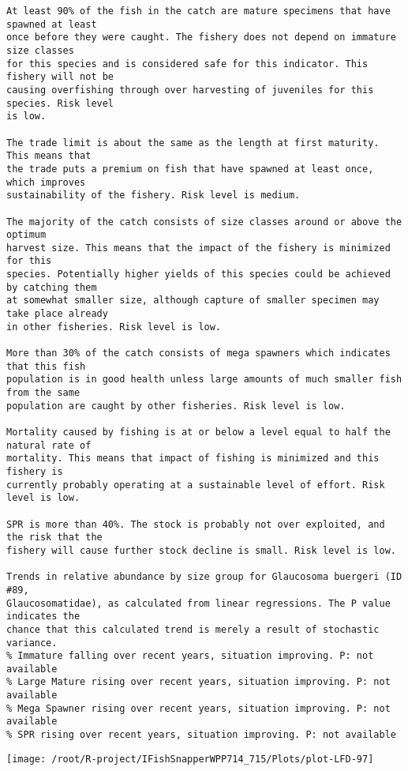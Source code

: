 \documentclass{report}\usepackage[]{graphicx}\usepackage[]{color}
\makeatletter
\def\maxwidth{ %
  \ifdim\Gin@nat@width>\linewidth
    \linewidth
  \else
    \Gin@nat@width
  \fi
}
\newenvironment{kframe}{%
 \def\at@end@of@kframe{}%
 \ifinner\ifhmode%
  \def\at@end@of@kframe{\end{minipage}}%
  \begin{minipage}{\columnwidth}%
 \fi\fi%
 \def\FrameCommand##1{\hskip\@totalleftmargin \hskip-\fboxsep
 \colorbox{shadecolor}{##1}\hskip-\fboxsep
     \hskip-\linewidth \hskip-\@totalleftmargin \hskip\columnwidth}%
 \MakeFramed {\advance\hsize-\width
   \@totalleftmargin\z@ \linewidth\hsize
   \@setminipage}}%
 {\par\unskip\endMakeFramed%
 \at@end@of@kframe}
\newenvironment{knitrout}{}{} %
\makeatother
\begin{document}
\begin{knitrout}
\begin{kframe}
\begin{verbatim}
At least 90% of the fish in the catch are mature specimens that have spawned at least
once before they were caught. The fishery does not depend on immature size classes
for this species and is considered safe for this indicator. This fishery will not be
causing overfishing through over harvesting of juveniles for this species. Risk level
is low.

The trade limit is about the same as the length at first maturity.  This means that
the trade puts a premium on fish that have spawned at least once, which improves
sustainability of the fishery. Risk level is medium.

The majority of the catch consists of size classes around or above the optimum
harvest size. This means that the impact of the fishery is minimized for this
species. Potentially higher yields of this species could be achieved by catching them
at somewhat smaller size, although capture of smaller specimen may take place already
in other fisheries. Risk level is low.

More than 30% of the catch consists of mega spawners which indicates that this fish
population is in good health unless large amounts of much smaller fish from the same
population are caught by other fisheries. Risk level is low.
 
Mortality caused by fishing is at or below a level equal to half the natural rate of
mortality. This means that impact of fishing is minimized and this fishery is
currently probably operating at a sustainable level of effort. Risk level is low.
 
SPR is more than 40%. The stock is probably not over exploited, and the risk that the
fishery will cause further stock decline is small. Risk level is low.
 
Trends in relative abundance by size group for Glaucosoma buergeri (ID #89,
Glaucosomatidae), as calculated from linear regressions. The P value indicates the
chance that this calculated trend is merely a result of stochastic variance.
% Immature falling over recent years, situation improving. P: not available
% Large Mature rising over recent years, situation improving. P: not available
% Mega Spawner rising over recent years, situation improving. P: not available
% SPR rising over recent years, situation improving. P: not available
\end{verbatim}
\end{kframe}
\texttt{[image: /root/R-project/IFishSnapperWPP714\_715/Plots/plot-LFD-97]} 


\end{knitrout}
\end{document}
